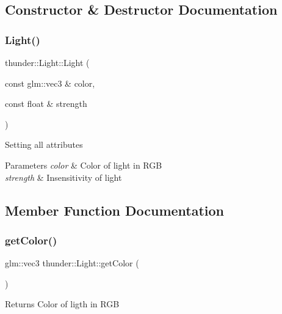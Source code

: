 \subsection{Constructor \& Destructor Documentation}
\mbox{\label{classthunder_1_1_light_a120bfc2c8eb595c452383e950c247dc7}} 
\subsubsection{\texorpdfstring{Light()}{Light()}}
{\footnotesize\ttfamily thunder\+::\+Light\+::\+Light (\begin{DoxyParamCaption}\item[{const glm\+::vec3 \&}]{color,  }\item[{const float \&}]{strength }\end{DoxyParamCaption})}

Setting all attributes


\begin{DoxyParams}{Parameters}
{\em color} & Color of light in R\+GB \\
\hline
{\em strength} & Insensitivity of light \\
\hline
\end{DoxyParams}


\subsection{Member Function Documentation}
\mbox{\label{classthunder_1_1_light_a02a1a60ca26e2002da0e44108c5231dd}} 
\subsubsection{\texorpdfstring{get\+Color()}{getColor()}}
{\footnotesize\ttfamily glm\+::vec3 thunder\+::\+Light\+::get\+Color (\begin{DoxyParamCaption}{ }\end{DoxyParamCaption})}

\begin{DoxyReturn}{Returns}
Color of ligth in R\+GB 
\end{DoxyReturn}
\mbox{\label{classthunder_1_1_light_afef27cd635c63f8e8b4cadb4d7b9800a}} 
